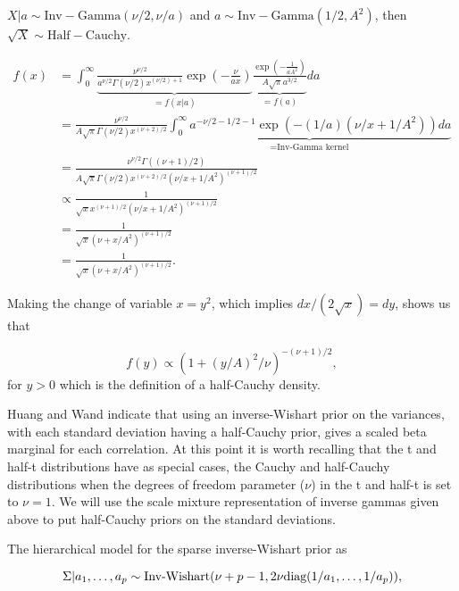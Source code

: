 $X\vert a \sim \mathrm{Inv-Gamma}(\nu/2, \nu/a)$ and  $a \sim \mathrm{Inv-Gamma}(1/2,A^2)$, then $\sqrt{X}\sim \mathrm{Half-Cauchy}$. 

\begin{align*}
f(x) &= \int_0^\infty \underbrace{  \frac{\nu^{\nu/2}}{a^{\nu/2}\Gamma(\nu/2)x^{(\nu/2)+1}}\exp{(-\frac{\nu}{ax})}   }_{=f(x\vert a)} \underbrace{\frac{\exp{(-\frac{1}{aA^2})}}{A\sqrt{\pi}a^{3/2}}}_{=f(a)} da\\
&=\frac{\nu^{\nu/2}}{A\sqrt{\pi}\Gamma(\nu/2)x^{(\nu+2)/2}}\underbrace{\int_0^\infty a^{-\nu/2-1/2-1}\exp{(-(1/a)(\nu/x+1/A^2))}da}_{=\text{Inv-Gamma kernel}}\\
&=\frac{\nu^{\nu/2}\Gamma((\nu+1)/2)}{A\sqrt{\pi}\Gamma(\nu/2)x^{(\nu+2)/2}(\nu/x+1/A^2)^{(\nu+1)/2}}\\
&\propto \frac{1}{\sqrt{x}x^{(\nu+1)/2}(\nu/x+1/A^2)^{(\nu+1)/2}}\\
& =\frac{1}{\sqrt{x}(\nu+x/A^2)^{(\nu+1)/2}  }\\
&=\frac{1}{\sqrt{x}(\nu+x/A^2)^{(\nu+1)/2}  }.
\end{align*}

Making the change of variable $x=y^2$, which implies $dx/(2\sqrt{x})=dy$, shows us that 

\begin{equation}
f(y) \propto (1+(y/A)^2/\nu)^{-(\nu+1)/2},
\end{equation}
for $y>0$ which is the definition of a half-Cauchy density. 

Huang and Wand \cite{huang2013simple} indicate that using an inverse-Wishart prior on the variances, with each standard deviation having a half-Cauchy prior, gives a scaled beta marginal for each correlation. At this point it is worth recalling that the t and half-t distributions have as special cases, the Cauchy and half-Cauchy distributions when the degrees of freedom parameter ($\nu$) in the t and half-t is set to $\nu=1$. We will use the scale mixture representation of inverse gammas given above to put half-Cauchy priors on the standard deviations.  

The hierarchical model for the sparse inverse-Wishart prior as

\begin{equation}\newnot{symbol:inv_wishart}
\Sigma\vert a_1, \dots,a_p \sim \text{Inv-Wishart}(\nu+p-1, 2\nu\text{diag}(1/a_1,\dots,1/a_p)), 
\end{equation} 

